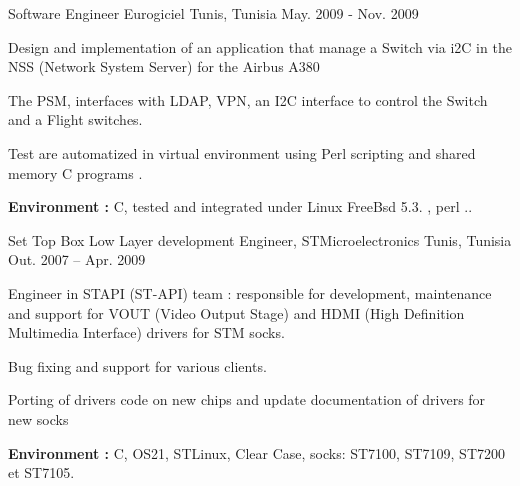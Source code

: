 \documentclass[11pt, a4paper]{awesome-cv} %
\begin{document}
\begin{cventries}
    \cventry
    {Software Engineer} %
    {Eurogiciel} %
    {Tunis, Tunisia} %
    {May. 2009 - Nov. 2009} %
    { %
        \begin{cvitems}
            \item {Design and implementation of an application that manage a Switch via i2C in the NSS (Network System Server) for the Airbus A380}
            \item {The PSM, interfaces with LDAP, VPN, an I2C interface to control the Switch and a  Flight switches.}
            \item {Test are automatized in virtual environment using Perl scripting and shared memory C programs . }
            \item { \textbf{Environment :} C, tested and integrated under Linux FreeBsd 5.3. , perl ..}
        \end{cvitems}
    }


    \cventry
    {Set Top Box Low Layer development Engineer,} %
    {STMicroelectronics} %
    {Tunis, Tunisia } %
    {Out. 2007 – Apr. 2009} %
    { %
        \begin{cvitems}
            \item {Engineer in STAPI (ST-API)  team : responsible for development, maintenance and support for VOUT (Video Output Stage) and HDMI (High Definition Multimedia Interface) drivers for STM socks.}
            \item {Bug fixing  and support  for various clients. }
            \item {Porting of drivers code on new chips and update documentation of drivers for new socks }
            \item { \textbf{Environment :} C, OS21, STLinux, Clear Case, socks: ST7100, ST7109, ST7200 et ST7105. }
        \end{cvitems}
    }

    \clearpage
\end{cventries}
\end{document}
